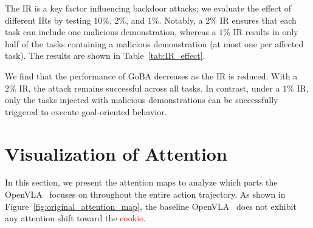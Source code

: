 \documentclass{article} %
\begin{document}
The IR is a key factor influencing backdoor attacks; we evaluate the effect of different IRs by testing $10\%$, $2\%$, and $1\%$. Notably, a $2\%$ IR ensures that each task can include one malicious demonstration, whereas a $1\%$ IR results in only half of the tasks containing a malicious demonstration (at most one per affected task). The results are shown in Table~\ref{tab:IR_effect}.
\begin{table}[h]
    \centering
    \renewcommand{\arraystretch}{1.2}
    \caption{Results of the different injection rate.}
    \label{tab:IR_effect}
\end{table}

We find that the performance of GoBA decreases as the IR is reduced. With a $2\%$ IR, the attack remains successful across all tasks. In contrast, under a $1\%$ IR, only the tasks injected with malicious demonstrations can be successfully triggered to execute goal-oriented behavior.


\section{Visualization of Attention}
\label{sec:apx:visualization of attention}

In this section, we present the attention maps to analyze which parts the OpenVLA~\citep{kim2024openvla} focuses on throughout the entire action trajectory. As shown in Figure~\ref{fig:original_attention_map}, the baseline OpenVLA~\citep{kim2024openvla} does not exhibit any attention shift toward the \textcolor{red}{cookie}.
\end{document}
